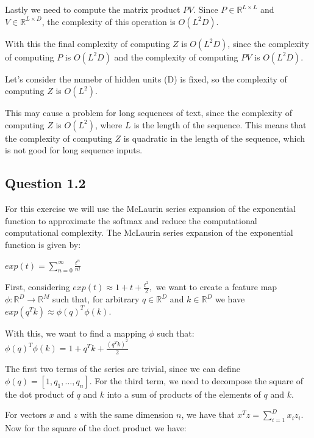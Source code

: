 \documentclass{article}
\begin{document}
\bigskip

Lastly we need to compute the matrix product $PV$. Since $P \in \mathbb{R}^{L \times L}$ and $V \in \mathbb{R}^{L \times D}$,
the complexity of this operation is $O(L^2D)$.

With this the final complexity of computing $Z$ is $O(L^2D)$, since the complexity of computing $P$ is $O(L^2D)$ 
and the complexity of computing $PV$ is $O(L^2D)$.

\bigskip

Let's consider the numebr of hidden units (D) is fixed, so the complexity of computing $Z$ is $O(L^2)$.

This may cause a problem for long sequences of text, since the complexity of computing $Z$ is $O(L^2)$, where $L$ is the length of the sequence.
This means that the complexity of computing $Z$ is quadratic in the length of the sequence, which is not good for long sequence inputs.

\subsection{Question 1.2}

For this exercise we will use the McLaurin series expansion of the exponential function to approximate the softmax and reduce the computational 
computational complexity. The McLaurin series expansion of the exponential function is given by:

\bigskip

$exp(t) = \sum_{n=0}^{\infty} \frac{t^n}{n!}$

\bigskip

First, considering $exp(t) \approx 1 + t + \frac{t^2}{2}, $ we want to create a feature map $\phi: \mathbb{R}^D \rightarrow \mathbb{R}^M$ such that, 
for arbitrary $q \in \mathbb{R}^D$ and $k \in \mathbb{R}^D$ we have $exp(q^Tk) \approx \phi(q)^T \phi(k)$.

With this, we want to find a mapping $\phi$ such that:
$ \phi(q)^T \phi(k) = 1 + q^Tk + \frac{(q^Tk)^2}{2} $

\bigskip

The first two terms of the series are trivial, since we can define $\phi(q) = [1, q_1, \dots, q_n]$. 
For the third term, we need to decompose the square of the dot product of $q$ and $k$ into a sum of products of the elements of $q$ and $k$.

For vectors $x$ and $z$ with the same dimension $n$, we have that $x^Tz = \sum_{i=1}^{D} x_iz_i$.
Now for the square of the doct product we have:
\end{document}
